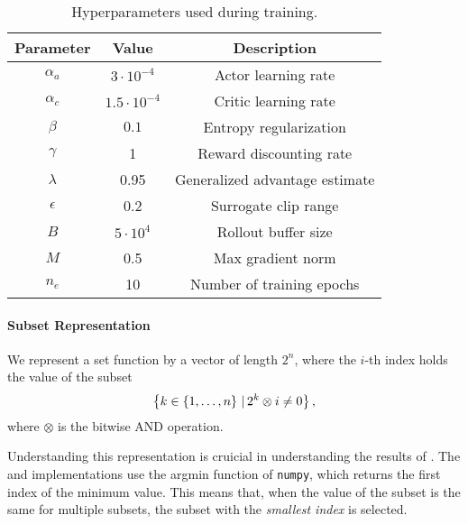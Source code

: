\begin{table}[t]
  \centering
  \begin{tabular}{c|c|c}
    \hline
    Parameter  & Value             & Description                    \\
    \hline
    \hline
    $\alpha_a$ & $3\cdot10^{-4}$   & Actor learning rate            \\
    $\alpha_c$ & $1.5\cdot10^{-4}$ & Critic learning rate           \\
    $\beta$    & $0.1$             & Entropy regularization         \\
    $\gamma$   & 1                 & Reward discounting rate        \\
    $\lambda$  & 0.95              & Generalized advantage estimate \\
    $\epsilon$ & 0.2               & Surrogate clip range           \\
    $B$        & $5\cdot 10^{4}$   & Rollout buffer size            \\
    $M$        & 0.5               & Max gradient norm              \\
    $n_e$      & 10                & Number of training epochs      \\
    \hline
  \end{tabular}
  \caption{Hyperparameters used during training.}
  \label{tab:ppo_params}
\end{table}

\paragraph{Subset Representation}
We represent a set function by a vector of length $ 2^n $, where the $ i $-th index holds the value of the subset \[
	\left\{ k \in \left\{ 1, \ldots, n \right\} \,|\, 2^k \otimes i \neq 0 \right\},
\]
where $ \otimes $ is the bitwise AND operation.

Understanding this representation is cruicial in understanding the results of .
The \algRG{} and \algFG{} implementations use the argmin function of \texttt{numpy}, which returns the first index of the minimum value.
This means that, when the value of the subset is the same for multiple subsets, the subset with the \emph{smallest index} is selected.
